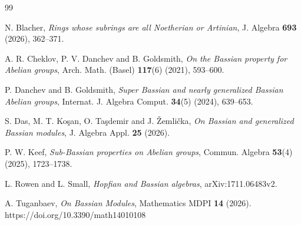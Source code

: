 \documentclass{amsart}
\theoremstyle{definition}
\begin{document}
\vskip2.0pc

\begin{thebibliography}{99}

 N. Blacher, {\it Rings whose subrings are all Noetherian or Artinian}, J. Algebra {\bf 693} (2026), 362--371.

 A. R. Cheklov, P. V. Danchev and B. Goldsmith, {\it On the Bassian property for Abelian groups}, Arch. Math. (Basel) {\bf 117}(6) (2021), 593--600.

 P. Danchev and B. Goldsmith, {\it Super Bassian and nearly generalized Bassian Abelian groups}, Internat. J. Algebra Comput. {\bf 34}(5) (2024), 639--653.

 S. Das, M. T. Ko\c{s}an, O. Ta\c{s}demir and J. \v{Z}emli\v{c}ka, {\it On Bassian and generalized Bassian modules}, J. Algebra Appl. {\bf 25} (2026).

 P. W. Keef, {\it Sub-Bassian properties on Abelian groups}, Commun. Algebra {\bf 53}(4) (2025), 1723--1738.

 L. Rowen and L. Small, {\it Hopfian and Bassian algebras}, arXiv:1711.06483v2.

 A. Tuganbaev, {\it On Bassian Modules}, Mathematics MDPI {\bf 14} (2026).
\\ https://doi.org/10.3390/math14010108

\end{thebibliography}
\end{document}
